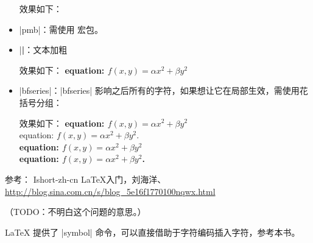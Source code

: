 \begin{itemize}
\begin{texlist}
  \end{texlist}
  效果如下：
  \item |pmb|：需使用  宏包。
  \item |\textbf|：文本加粗
  效果如下：
  \textbf{equation: $f(x,y)=\alpha x^2+\beta y^2$}
  \item |bfseries|：|bfseries| 影响之后所有的字符，如果想让它在局部生效，需使用花括号分组：
  效果如下：
  {\bfseries equation: $f(x,y) = \alpha x^2 + \beta y^2$}\\
  equation: $f(x,y) = \alpha x^2 + \beta y^2$.\\
  \bfseries equation: $f(x,y) = \alpha x^2 + \beta y^2$\\
  equation: $f(x,y) = \alpha x^2 + \beta y^2$.\\
\end{itemize}
  参考： Ishort-zh-cn LaTeX入门，刘海洋、\url{http://blog.sina.com.cn/s/blog_5e16f1770100nqwx.html}




（TODO：不明白这个问题的意思。）





\LaTeX{} 提供了 |symbol| 命令，可以直接借助于字符编码插入字符，参考本书。

